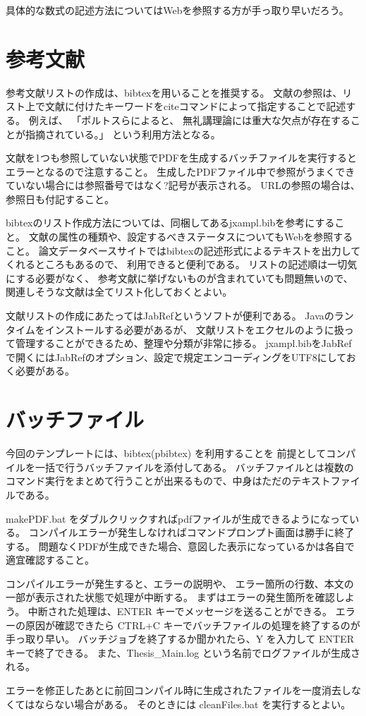 具体的な数式の記述方法についてはWebを参照する方が手っ取り早いだろう。

\section{参考文献}
\label{sec:bib}

参考文献リストの作成は、bibtexを用いることを推奨する。
文献の参照は、リスト上で文献に付けたキーワードをciteコマンドによって指定することで記述する。
例えば、
「ポルトスら\cite{TellMePorthos}によると、
無礼講理論\cite{DayPosER_11_12}には重大な欠点が存在することが指摘されている。」
という利用方法となる。

文献を1つも参照していない状態でPDFを生成するバッチファイルを実行するとエラーとなるので注意すること。
生成したPDFファイル中で参照がうまくできていない場合には参照番号ではなく?記号が表示される。
URLの参照\cite{URLSample}の場合は、参照日も付記すること。

bibtexのリスト作成方法については、同梱してあるjxampl.bibを参考にすること。
文献の属性の種類や、設定するべきステータスについてもWebを参照すること。
論文データベースサイトではbibtexの記述形式によるテキストを出力してくれるところもあるので、
利用できると便利である。
リストの記述順は一切気にする必要がなく、
参考文献に挙げないものが含まれていても問題無いので、関連しそうな文献は全てリスト化しておくとよい。

文献リストの作成にあたってはJabRefというソフトが便利である。
Javaのランタイムをインストールする必要があるが、
文献リストをエクセルのように扱って管理することができるため、整理や分類が非常に捗る。
jxampl.bibをJabRefで開くにはJabRefのオプション、設定で規定エンコーディングをUTF8にしておく必要がある。

\section{バッチファイル}
\label{sec:bat}

今回のテンプレートには、bibtex(pbibtex) を利用することを
前提としてコンパイルを一括で行うバッチファイルを添付してある。
バッチファイルとは複数のコマンド実行をまとめて行うことが出来るもので、中身はただのテキストファイルである。

makePDF.bat をダブルクリックすればpdfファイルが生成できるようになっている。
コンパイルエラーが発生しなければコマンドプロンプト画面は勝手に終了する。
問題なくPDFが生成できた場合、意図した表示になっているかは各自で適宜確認すること。

コンパイルエラーが発生すると、エラーの説明や、
エラー箇所の行数、本文の一部が表示された状態で処理が中断する。
まずはエラーの発生箇所を確認しよう。
中断された処理は、ENTER キーでメッセージを送ることができる。
エラーの原因が確認できたら CTRL+C キーでバッチファイルの処理を終了するのが手っ取り早い。
バッチジョブを終了するか聞かれたら、Y を入力して ENTER キーで終了できる。
また、Thesis\_Main.log という名前でログファイルが生成される。

エラーを修正したあとに前回コンパイル時に生成されたファイルを一度消去しなくてはならない場合がある。
そのときには cleanFiles.bat を実行するとよい。
